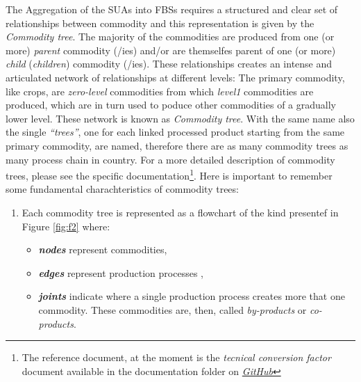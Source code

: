 \documentclass[]{article}
\providecommand{\tightlist}{%
  \setlength{\itemsep}{0pt}\setlength{\parskip}{0pt}}
\let\rmarkdownfootnote\footnote%
\def\footnote{\protect\rmarkdownfootnote}
\begin{document}
The Aggregation of the SUAs into FBSs requires a structured and clear
set of relationships between commodity and this representation is given
by the \emph{Commodity tree}. The majority of the commodities are
produced from one (or more) \emph{parent} commodity (/ies) and/or are
themselfes parent of one (or more) \emph{child} (\emph{children})
commodity (/ies). These relationships creates an intense and articulated
network of relationships at different levels: The primary commodity,
like crops, are \emph{zero-level} commodities from which \emph{level1}
commodities are produced, which are in turn used to poduce other
commodities of a gradually lower level. These network is known as
\emph{Commodity tree}. With the same name also the single
\emph{``trees''}, one for each linked processed product starting from
the same primary commodity, are named, therefore there are as many
commodity trees as many process chain in country. For a more detailed
description of commodity trees, please see the specific
documentation\footnote{The reference document, at the moment is the
  \emph{tecnical conversion factor} document available in the
  documentation folder on
  \href{https://github.com/SWS-Methodology/faoswsStandardization/tree/master/documentation}{\emph{GitHub}}}.
Here is important to remember some fundamental charachteristics of
commodity trees:

\begin{enumerate}
\def\labelenumi{\arabic{enumi}.}
\tightlist
\item
  Each commodity tree is represented as a flowchart of the kind
  presentef in Figure \ref{fig:f2} where:

  \begin{itemize}
  \tightlist
  \item
    \textbf{\emph{nodes}} represent commodities,
  \item
    \textbf{\emph{edges}} represent production processes ,
  \item
    \textbf{\emph{joints}} indicate where a single production process
    creates more that one commodity. These commodities are, then, called
    \emph{by-products} or \emph{co-products}.
  \end{itemize}
\end{enumerate}
\end{document}
